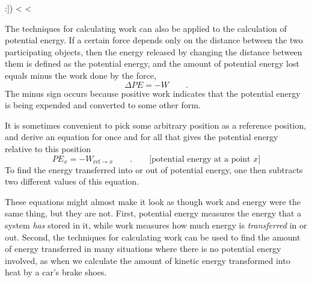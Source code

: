 \vfill
:])
<%
<%

The techniques for calculating work can also be applied to
the calculation of potential energy. If a certain force
depends only on the distance between the two participating
objects, then the energy released by changing the distance
between them is defined as the potential energy, and the
amount of potential energy lost equals minus the work done by the force,
\begin{equation*}
                \Delta PE  =  -W  \qquad .
\end{equation*}
The minus sign occurs because positive work indicates that
the potential energy is being expended and converted to some other form.

It is sometimes convenient to pick some arbitrary position
as a reference position, and derive an equation for once and
for all that gives the potential energy relative to this position
\begin{equation*}
                PE_x  =  -W_{\text{ref}\rightarrow x}        \qquad .    
\qquad  \text{[potential energy at a point $x$]}
\end{equation*}
To find the energy transferred into or out of potential
energy, one then subtracts two different values of this equation.

These equations might almost make it look as though work and
energy were the same thing, but they are not. First,
potential energy measures the energy that a system
\emph{has} stored in it, while work measures how much energy
is \emph{transferred} in or out. Second, the techniques for
calculating work can be used to find the amount of energy
transferred in many situations where there is no potential
energy involved, as when we calculate the amount of kinetic
energy transformed into heat by a car's brake shoes.

